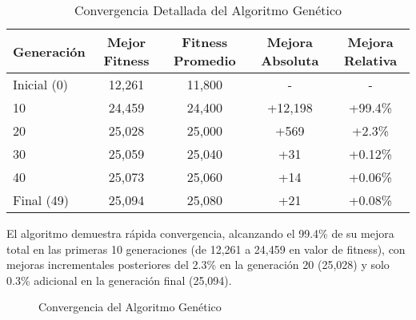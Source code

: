 \documentclass[12pt,a4paper]{article}
\begin{document}
\begin{table}[H]
\centering
\caption{Convergencia Detallada del Algoritmo Genético}
\label{tab:convergencia_AG}
\begin{tabular}{@{}lcccc@{}}
\toprule
\textbf{Generación} & \textbf{Mejor Fitness} & \textbf{Fitness Promedio} & \textbf{Mejora Absoluta} & \textbf{Mejora Relativa} \\
\midrule
Inicial (0) & 12,261 & 11,800 & - & - \\
10 & 24,459 & 24,400 & +12,198 & +99.4\% \\
20 & 25,028 & 25,000 & +569 & +2.3\% \\
30 & 25,059 & 25,040 & +31 & +0.12\% \\
40 & 25,073 & 25,060 & +14 & +0.06\% \\
Final (49) & 25,094 & 25,080 & +21 & +0.08\% \\
\bottomrule
\end{tabular}
\end{table}
El algoritmo demuestra rápida convergencia, alcanzando el 99.4\% de su mejora total en las primeras 10 generaciones (de 12,261 a 24,459 en valor de fitness), con mejoras incrementales posteriores del 2.3\% en la generación 20 (25,028) y solo 0.3\% adicional en la generación final (25,094). 


\begin{figure}[H]
\centering
{}
\caption{Convergencia del Algoritmo Genético}
\label{fig:convergence}
\end{figure}
\end{document}
